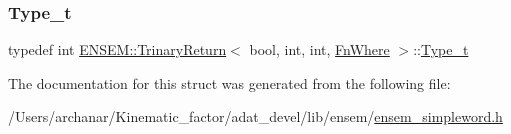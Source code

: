\mbox{\label{structENSEM_1_1TrinaryReturn_3_01bool_00_01int_00_01int_00_01FnWhere_01_4_a903989cc198f060fec5777b5c3b18657}} 
\subsubsection{\texorpdfstring{Type\_t}{Type\_t}\hspace{0.1cm}{\footnotesize\ttfamily [2/2]}}
{\footnotesize\ttfamily typedef int \mbox{\hyperlink{structENSEM_1_1TrinaryReturn}{E\+N\+S\+E\+M\+::\+Trinary\+Return}}$<$ bool, int, int, \mbox{\hyperlink{structENSEM_1_1FnWhere}{Fn\+Where}} $>$\+::\mbox{\hyperlink{structENSEM_1_1TrinaryReturn_3_01bool_00_01int_00_01int_00_01FnWhere_01_4_a903989cc198f060fec5777b5c3b18657}{Type\+\_\+t}}}



The documentation for this struct was generated from the following file\+:\begin{DoxyCompactItemize}
\item 
/\+Users/archanar/\+Kinematic\+\_\+factor/adat\+\_\+devel/lib/ensem/\mbox{\hyperlink{lib_2ensem_2ensem__simpleword_8h}{ensem\+\_\+simpleword.\+h}}\end{DoxyCompactItemize}
